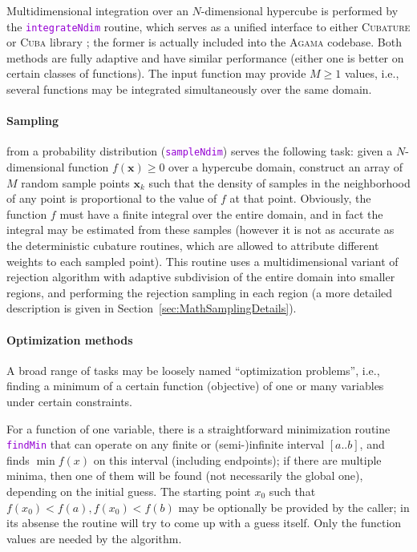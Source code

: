 \documentclass[12pt]{article}
\newcommand{\Agama}{\textsc{Agama}\xspace}
\newcommand{\ttt}[1]{\textcolor{darkviolet}{\texttt{#1}}}
\newcommand{\bx}{\boldsymbol{x}}
\begin{document}
Multidimensional integration over an $N$-dimensional hypercube is performed by the \ttt{integrateNdim} routine, which serves as a unified interface to either \textsc{Cubature} or \textsc{Cuba} library \cite{Cuba}; the former is actually included into the \Agama codebase. Both methods are fully adaptive and have similar performance (either one is better on certain classes of functions). The input function may provide $M\ge 1$ values, i.e., several functions may be integrated simultaneously over the same domain.

\paragraph{Sampling} \label{sec:Sampling}  from a probability distribution (\ttt{sampleNdim}) serves the following task: given a $N$-dimensional function $f(\bx)\ge 0$ over a hypercube domain, construct an array of $M$ random sample points $\bx_k$ such that the density of samples in the neighborhood of any point is proportional to the value of $f$ at that point. Obviously, the function $f$ must have a finite integral over the entire domain, and in fact the integral may be estimated from these samples (however it is not as accurate as the deterministic cubature routines, which are allowed to attribute different weights to each sampled point). This routine uses a multidimensional variant of rejection algorithm with adaptive subdivision of the entire domain into smaller regions, and performing the rejection sampling in each region (a more detailed description is given in Section~\ref{sec:MathSamplingDetails}).

\paragraph{Optimization methods}
A broad range of tasks may be loosely named ``optimization problems'', i.e., finding a minimum of a certain function (objective) of one or many variables under certain constraints.

For a function of one variable, there is a straightforward minimization routine \ttt{findMin} that can operate on any finite or (semi-)infinite interval $[a..b]$, and finds $\min f(x)$ on this interval (including endpoints); if there are multiple minima, then one of them will be found (not necessarily the global one), depending on the initial guess. The starting point $x_0$ such that  $f(x_0)<f(a), f(x_0)<f(b)$ may be optionally be provided by the caller; in its absense the routine will try to come up with a guess itself. Only the function values are needed by the algorithm.
\end{document}
